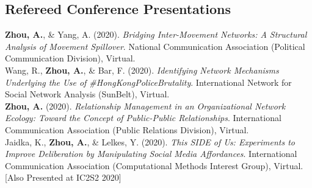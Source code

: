 \documentclass[12pt, letterpaper]{article}
\newcommand{\years}[1]{\marginnote{\normalsize #1}}
\begin{document}
{\subsection*{Refereed Conference Presentations}

\years{[12]} \textbf{Zhou, A.}, \& Yang, A. (2020). \textit{Bridging Inter-Movement Networks: A Structural Analysis of Movement Spillover}. National Communication Association (Political Communication Division), Virtual.\\
\years{[11]} Wang, R., \textbf{Zhou, A.}, \& Bar, F. (2020). \textit{Identifying Network Mechanisms Underlying the Use of \#HongKongPoliceBrutality}. International Network for Social Network Analysis (SunBelt), Virtual.\\
\years{[10]} \textbf{Zhou, A.} (2020). \textit{Relationship Management in an Organizational Network Ecology: Toward the Concept of Public-Public Relationships}. International Communication Association (Public Relations Division), Virtual.\\
\years{[9]} Jaidka, K., \textbf{Zhou, A.}, \& Lelkes, Y. (2020). \textit{This SIDE of Us: Experiments to Improve Deliberation by Manipulating Social Media Affordances}. International Communication Association (Computational Methods Interest Group), Virtual. [Also Presented at IC2S2 2020]\\
}
\end{document}
